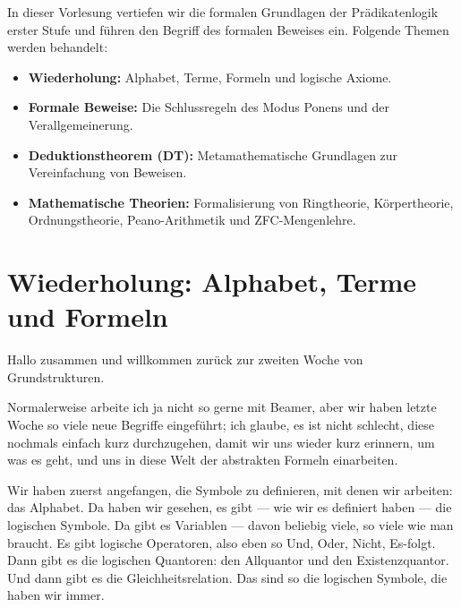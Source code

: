 

\begin{nice-box}
In dieser Vorlesung vertiefen wir die formalen Grundlagen der Prädikatenlogik erster Stufe und führen den Begriff des formalen Beweises ein. Folgende Themen werden behandelt:
\begin{itemize}
    \item \textbf{Wiederholung:} Alphabet, Terme, Formeln und logische Axiome.
    \item \textbf{Formale Beweise:} Die Schlussregeln des Modus Ponens und der Verallgemeinerung.
    \item \textbf{Deduktionstheorem (DT):} Metamathematische Grundlagen zur Vereinfachung von Beweisen.
    \item \textbf{Mathematische Theorien:} Formalisierung von Ringtheorie, Körpertheorie, Ordnungstheorie, Peano-Arithmetik und ZFC-Mengenlehre.
\end{itemize}
\end{nice-box}

\section{Wiederholung: Alphabet, Terme und Formeln}

\begin{spoken-clean}[00:00:00 - 00:01:04]
Hallo zusammen und willkommen zurück zur zweiten Woche von Grundstrukturen. 

Normalerweise arbeite ich ja nicht so gerne mit Beamer, aber wir haben letzte Woche so viele neue Begriffe eingeführt; ich glaube, es ist nicht schlecht, diese nochmals einfach kurz durchzugehen, damit wir uns wieder kurz erinnern, um was es geht, und uns in diese Welt der abstrakten Formeln einarbeiten. 

Wir haben zuerst angefangen, die Symbole zu definieren, mit denen wir arbeiten: das Alphabet. Da haben wir gesehen, es gibt --- wie wir es definiert haben --- die logischen Symbole. Da gibt es Variablen --- davon beliebig viele, so viele wie man braucht. Es gibt logische Operatoren, also eben so Und, Oder, Nicht, Es-folgt. Dann gibt es die logischen Quantoren: den Allquantor und den Existenzquantor. Und dann gibt es die Gleichheitsrelation. Das sind so die logischen Symbole, die haben wir immer.
\end{spoken-clean}

